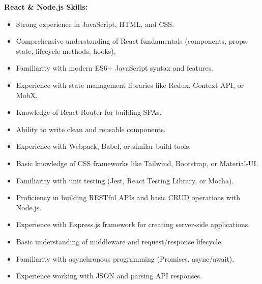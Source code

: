\documentclass[a4paper,10pt]{article}
\begin{document}
\noindent\textbf{React \& Node.js Skills:}
\begin{itemize}[leftmargin=0.15in, itemsep=0.1em]
    \item Strong experience in JavaScript, HTML, and CSS.
    \item Comprehensive understanding of React fundamentals (components, props, state, lifecycle methods, hooks).
    \item Familiarity with modern ES6+ JavaScript syntax and features.
    \item Experience with state management libraries like Redux, Context API, or MobX.
    \item Knowledge of React Router for building SPAs.
    \item Ability to write clean and reusable components.
    \item Experience with Webpack, Babel, or similar build tools.
    \item Basic knowledge of CSS frameworks like Tailwind, Bootstrap, or Material-UI.
    \item Familiarity with unit testing (Jest, React Testing Library, or Mocha).
    \item Proficiency in building RESTful APIs and basic CRUD operations with Node.js.
    \item Experience with Express.js framework for creating server-side applications.
    \item Basic understanding of middleware and request/response lifecycle.
    \item Familiarity with asynchronous programming (Promises, async/await).
    \item Experience working with JSON and parsing API responses.
\end{itemize}
\end{document}

